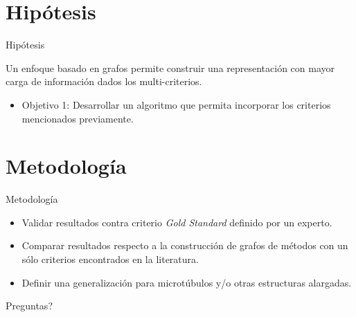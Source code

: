 \documentclass[10pt]{beamer}
\newcommand{\themename}{\textbf{\textsc{metropolis}}\xspace}
\begin{document}
\section{Hip\'otesis}

\begin{frame}[fragile]{Hip\'otesis}

Un enfoque basado en grafos  permite construir una representaci\'on con mayor carga de informaci\'on dados los multi-criterios.

\begin{itemize}
    \item Objetivo 1: Desarrollar un algoritmo que permita incorporar los criterios mencionados previamente. 
\end{itemize}

\end{frame}

\section{Metodolog\'ia}

\begin{frame}{Metodolog\'ia}
  \begin{itemize}
    \item Validar resultados contra criterio \textit{Gold Standard} definido por un experto.
    \item Comparar resultados respecto a la construcci\'on de grafos de m\'etodos con un s\'olo criterios encontrados en la literatura. 
    \item Definir una generalizaci\'on para microt\'ubulos y/o otras estructuras alargadas.
  \end{itemize}
\end{frame}



{
\begin{frame}[standout]
  Preguntas?
\end{frame}
}

\appendix





%  
%  

\end{document}

